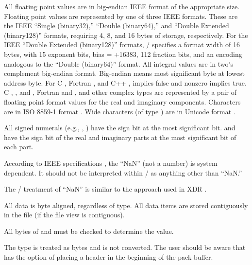 All floating point values are in big-endian
IEEE format \cite{ieee-754-2008} of the appropriate size.
Floating point values are represented by one
of three IEEE formats. 
 These are the IEEE ``Single (binary32),'' ``Double (binary64),'' and 
``Double Extended (binary128)'' formats, requiring 4, 8, and 16 bytes of storage, 
respectively. 
For the IEEE ``Double Extended (binary128)'' formats, \MPI/ specifies a
format width of 16 bytes, with 15 exponent bits, 
bias = +16383,
112 fraction bits, and an encoding analogous to the ``Double (binary64)'' format. 
All integral values are in two's complement big-endian format.
Big-endian means most significant byte at lowest address byte.
 For C , Fortran , and C++ ,
  implies false and nonzero implies true. 
 C , , and , 
 Fortran  and , and other complex
 types are represented
 by a pair of floating point
 format values for the real and imaginary components.
Characters are in ISO 8859-1 format \cite{ISO-8859-1}.
Wide characters (of type )
are in Unicode format \cite{UNICODE}.

All signed numerals (e.g., , )
have the sign bit at the most significant bit.
 and  have the sign
bit of the real and imaginary parts at the most significant bit of each part.

According to IEEE specifications \cite{ieee-754-2008}, the ``NaN''
(not a number) is system dependent.
 It should not be interpreted within \MPI/ as
anything other than ``NaN.''

\begin{implementors}
The \MPI/ treatment of ``NaN'' is similar to the approach used in XDR \cite{IETF-RFC4506}.
\end{implementors}

All data is byte aligned, regardless of type.
All data items are stored contiguously in the file
(if the file view is contiguous).

\begin{implementors}
All bytes of  and  must be checked
to determine the value.
\end{implementors}

\begin{users}
The type  is treated as bytes and is not converted.
The user should be aware that  has the option of placing
a header in the beginning of the pack buffer.
\end{users}

